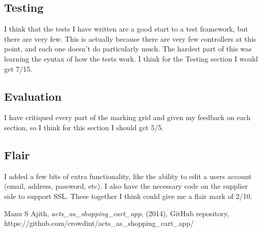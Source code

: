 \documentclass[11pt]{article}
\begin{document}
\subsection{Testing}
I think that the tests I have written are a good start to a test framework, but there are very few. This is actually because there are very few controllers at this point, and each one doesn't do particularly much.
The hardest part of this was learning the syntax of how the tests work.
I think for the Testing section I would get 7/15.

\subsection{Evaluation}
I have critiqued every part of the marking grid and given my feedback on each section, so I think for this section I should get 5/5.

\subsection{Flair}
I added a few bits of extra functionality, like the ability to edit a users account (email, address, password, etc). I also have the necessary code on the supplier side to support SSL.
These together I think could give me a flair mark of 2/10.

\begin{thebibliography}{1}

\bibitem{}
Manu S Ajith,
\emph{acts\_as\_shopping\_cart\_app},
(2014),
GitHub repository,
https://github.com/crowdint/acts\_as\_shopping\_cart\_app/

\end{thebibliography}
\end{document}
